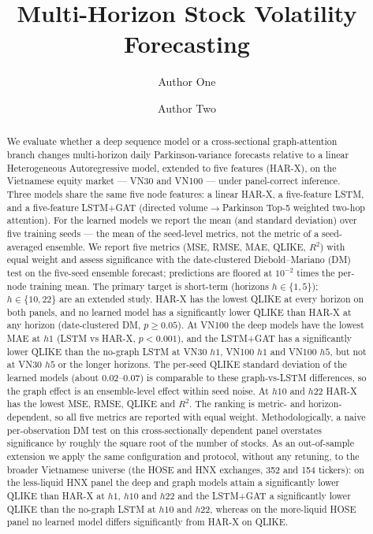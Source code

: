 \documentclass[runningheads]{llncs}
\begin{document}
\title{Multi-Horizon Stock Volatility Forecasting}

\author{Author One \and Author Two}

\maketitle

\begin{abstract}
We evaluate whether a deep sequence model or a cross-sectional graph-attention branch changes multi-horizon
daily Parkinson-variance forecasts relative to a linear Heterogeneous Autoregressive model, extended to five features (HAR-X), on the
Vietnamese equity market --- VN30 and VN100 --- under panel-correct inference.
Three models share the same five node features: a linear HAR-X, a
five-feature LSTM, and a five-feature LSTM+GAT (directed volume$\to$Parkinson Top-5 weighted two-hop
attention). For the learned models we report the mean (and standard deviation) over five training seeds ---
the mean of the seed-level metrics, not the metric of a seed-averaged ensemble. We report five metrics (MSE,
RMSE, MAE, QLIKE, $R^2$) with equal weight and assess significance with the date-clustered Diebold--Mariano
(DM) test on the five-seed ensemble forecast; predictions are floored at $10^{-2}$ times the per-node training
mean. The primary target is short-term (horizons $h\in\{1,5\}$); $h\in\{10,22\}$ are an extended study. HAR-X
has the lowest QLIKE at every horizon on both panels, and no learned model has a significantly lower QLIKE than
HAR-X at any horizon (date-clustered DM, $p\ge0.05$). At VN100 the deep models have the lowest MAE at $h1$
(LSTM vs HAR-X, $p<0.001$), and the LSTM+GAT has a significantly lower QLIKE than the no-graph LSTM at VN30
$h1$, VN100 $h1$ and VN100 $h5$, but not at VN30 $h5$ or the longer horizons. The per-seed QLIKE standard
deviation of the learned models (about $0.02$--$0.07$) is comparable to these graph-vs-LSTM differences, so the
graph effect is an ensemble-level effect within seed noise. At $h10$ and $h22$ HAR-X has the lowest MSE, RMSE,
QLIKE and $R^2$. The ranking is metric- and horizon-dependent, so all five metrics are reported with equal
weight. Methodologically, a naive per-observation DM test on this cross-sectionally dependent panel overstates
significance by roughly the square root of the number of stocks.
As an out-of-sample extension we apply the same configuration and protocol, without any retuning, to the broader
Vietnamese universe (the HOSE and HNX exchanges, 352 and 154 tickers): on the less-liquid HNX panel the deep and
graph models attain a significantly lower QLIKE than HAR-X at $h1$, $h10$ and $h22$ and the LSTM+GAT a
significantly lower QLIKE than the no-graph LSTM at $h10$ and $h22$, whereas on the more-liquid HOSE panel no
learned model differs significantly from HAR-X on QLIKE.
\end{abstract}
\end{document}

